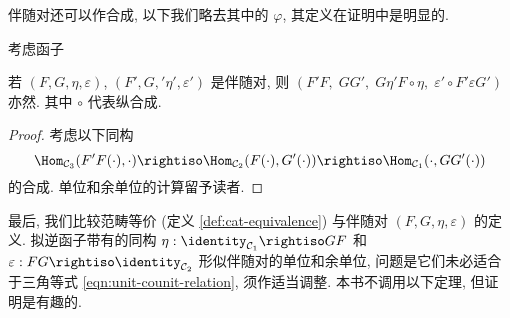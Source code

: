 伴随对还可以作合成, 以下我们略去其中的 $\varphi$, 其定义在证明中是明显的.

\begin{proposition}\label{prop:adjunction-composition}
	考虑函子
	若 $(F, G, \eta, \varepsilon)$, $(F', G,' \eta', \varepsilon')$ 是伴随对, 则 $(F'F, \; GG', \; G \eta' F \circ \eta, \; \varepsilon' \circ F' \varepsilon G')$ 亦然. 其中 $\circ$ 代表纵合成.
\end{proposition}
\begin{proof}
	考虑以下同构
	\[ \Hom_{\mathcal{C}_3}(F'F(\cdot), \cdot) \rightiso \Hom_{\mathcal{C}_2}(F(\cdot), G'(\cdot)) \rightiso \Hom_{\mathcal{C}_1}(\cdot, GG'(\cdot)) \]
	的合成. 单位和余单位的计算留予读者.
\end{proof}

最后, 我们比较范畴等价 (定义 \ref{def:cat-equivalence}) 与伴随对 $(F, G, \eta, \varepsilon)$ 的定义. 拟逆函子带有的同构 $\eta: \identity_{\mathcal{C}_1} \rightiso GF$ 和 $\varepsilon: FG \rightiso \identity_{\mathcal{C}_2}$ 形似伴随对的单位和余单位, 问题是它们未必适合于三角等式 \eqref{eqn:unit-counit-relation}, 须作适当调整. 本书不调用以下定理, 但证明是有趣的.

